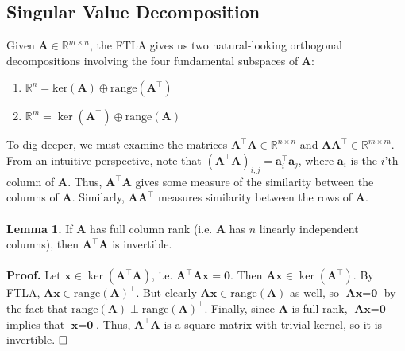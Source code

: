 \documentclass{article}
\begin{document}
\subsection*{Singular Value Decomposition}
Given $\textbf{A} \in \mathbb{R}^{m \times n}$, the FTLA gives us two natural-looking orthogonal decompositions involving the four fundamental subspaces of $\mathbf{A}$:
\begin{enumerate}[label=(\roman*)]
    \item $\mathbb{R}^n = \text{ker}(\textbf{A}) \oplus \text{range}(\textbf{A}^\top)$
    \item $\mathbb{R}^m = \ker(\textbf{A}^\top) \oplus \text{range}(\textbf{A})$
\end{enumerate}
To dig deeper, we must examine the matrices $\textbf{A}^\top\textbf{A} \in \mathbb{R}^{n \times n}$ and $\textbf{A}\textbf{A}^\top \in \mathbb{R}^{m \times m}$. 
From an intuitive perspective, note that $(\textbf{A}^\top\textbf{A})_{i,j} = \textbf{a}_i^{\top}\textbf{a}_j$, where $\textbf{a}_i$ is the $i$'th column of $\textbf{A}$. Thus, $\textbf{A}^\top\textbf{A}$ gives some measure of the similarity between the columns of $\textbf{A}$. Similarly, $\textbf{A}\textbf{A}^\top$ measures similarity between the rows of $\textbf{A}$.
\\ \\
\textbf{Lemma 1.} If $\textbf{A}$ has full column rank (i.e. $\textbf{A}$ has $n$ linearly independent columns), then $\textbf{A}^\top\textbf{A}$ is invertible.
\\ \\
\textbf{Proof.} Let $\textbf{x} \in \ker(\textbf{A}^\top\textbf{A})$, i.e. $\textbf{A}^\top\textbf{A}\textbf{x} = \textbf{0}$. Then $\textbf{A}\textbf{x} \in \ker(\textbf{A}^\top)$. By FTLA, $\textbf{A}\textbf{x} \in \text{range}(\textbf{A})^\perp$. But clearly $\textbf{A}\textbf{x} \in \text{range}(\textbf{A})$ as well, so $\textbf{A}\textbf{x} = \textbf{0}$ by the fact that $\text{range}(\textbf{A}) \perp \text{range}(\textbf{A})^\perp$. Finally, since $\textbf{A}$ is full-rank, $\textbf{A}\textbf{x} = \textbf{0}$ implies that $\textbf{x} = \textbf{0}$. Thus, $\textbf{A}^\top\textbf{A}$ is a square matrix with trivial kernel, so it is invertible. $\hfill\square$
\\ \\
\end{document}
